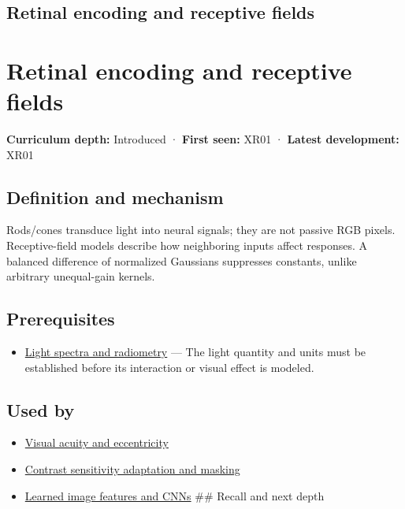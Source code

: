 \hypertarget{appendix-7281c15ac44a}{}
\section*{Retinal encoding and receptive fields}
\chapter{Retinal encoding and receptive fields}\label{appendix-7281c15ac44a-retinal-encoding-and-receptive-fields}

\textbf{Curriculum depth:} Introduced · \textbf{First seen:} XR01 · \textbf{Latest development:} XR01

\section{Definition and mechanism}\label{appendix-7281c15ac44a-definition-and-mechanism}

Rods/cones transduce light into neural signals; they are not passive RGB pixels. Receptive-field models describe how neighboring inputs affect responses. A balanced difference of normalized Gaussians suppresses constants, unlike arbitrary unequal-gain kernels.

\section{Prerequisites}\label{appendix-7281c15ac44a-prerequisites}

\begin{itemize}
\tightlist
\item
  \hyperref[appendix-215c2570199b]{Light spectra and radiometry} --- The light quantity and units must be established before its interaction or visual effect is modeled.
\end{itemize}

\section{Used by}\label{appendix-7281c15ac44a-used-by}

\begin{itemize}
\item
  \hyperref[appendix-b491fc48c54b]{Visual acuity and eccentricity}
\item
  \hyperref[appendix-b3aa9e8e01ad]{Contrast sensitivity adaptation and masking}
\item
  \hyperref[appendix-47c51ea026fb]{Learned image features and CNNs} \#\# Recall and next depth
\end{itemize}

